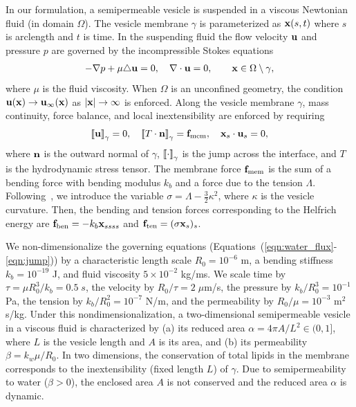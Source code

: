 \documentclass[prb,preprint,showpacs,preprintnumbers,amsmath,amssymb,longbibliography]{revtex4-1}
\begin{document}

In our formulation, a semipermeable vesicle is suspended in a viscous Newtonian fluid 
(in domain $\Omega$).  The vesicle membrane $\gamma$ is parameterized as $\mathbf{x}(s,t)$
where $s$ is arclength and $t$ is time. In the suspending fluid the flow
velocity $\mathbf{u}$ and pressure $p$ are governed by the incompressible 
Stokes equations
\begin{align}
  \label{eqn:governing}
  -\nabla p + \mu \triangle \mathbf{u} = 0, \quad
  \nabla \cdot \mathbf{u} = 0, \qquad \mathbf{x} \in \Omega \setminus \gamma,
\end{align}
where $\mu$ is the fluid viscosity. When $\Omega$ is an unconfined
geometry, the condition $\mathbf{u}(\mathbf{x}) \rightarrow \mathbf{u}_\infty(\mathbf{x})$ as $|\mathbf{x}|
\rightarrow \infty$ is enforced. 
%
Along the vesicle membrane $\gamma$,
mass continuity, force balance, and local inextensibility are enforced
by requiring
\begin{align}
  \label{eqn:jump}
  \left[\!\left[ \mathbf{u} \right]\!\right]_\gamma = 0, \quad
  \left[\!\left[ T\cdot\mathbf{n} \right]\!\right]_\gamma = \mathbf{f}_\mathrm{mem}, \quad
  \mathbf{x}_s \cdot \mathbf{u}_s = 0,
\end{align}
where $\mathbf{n}$ is the outward normal of $\gamma$, $\left[\!\left[ \cdot \right]\!\right]_\gamma$ is the
jump across the interface, and $T$ is the hydrodynamic stress tensor.
The membrane force $\mathbf{f}_\mathrm{mem}$ is the sum of a bending force
with bending modulus $k_b$ and a force due to the tension $\Lambda$.
Following~\cite{vee-gue-zor-bir2009}, we introduce the variable $\sigma
= \Lambda - \frac{3}{2}\kappa^2$, where $\kappa$ is the vesicle curvature. Then,
the bending and tension forces corresponding to the Helfrich energy are
$\mathbf{f}_\mathrm{ben} = -k_b \mathbf{x}_{ssss}$ and $\mathbf{f}_\mathrm{ten} = (\sigma
\mathbf{x}_s)_s$. 


We non-dimensionalize the governing equations (Equations~(\ref{eqn:water_flux}-\ref{eqn:jump})) by a
characteristic length scale $R_0 = 10^{-6}$ m, a bending stiffness $k_b
= 10^{-19}$ J, and fluid viscosity $5 \times 10^{-2}$ kg/ms. We scale
time by $\tau = \mu R_0^3/k_b = 0.5\;s$, the velocity by $R_0/\tau =
2\;\mu$m/s, the pressure by $k_b/R_0^3 = 10^{-1}$ Pa, the tension by
$k_b/R_0^2 = 10^{-7}$ N/m, and the permeability by $R_0/\mu = 10^{-3}$
m$^2$s/kg. Under this nondimensionalization, a two-dimensional
semipermeable vesicle in a viscous fluid is characterized by (a) its
reduced area $\alpha = 4\pi A/L^2 \in (0,1]$, where $L$ is the vesicle
length and $A$ is its area, and (b) its permeability $\beta = k_w \mu
/R_0$. 
In two dimensions, the conservation of total lipids in the membrane corresponds to the inextensibility (fixed length $L$) of $\gamma$.
Due to semipermeability to water ($\beta>0$),  the enclosed area $A$ is not conserved and the reduced area $\alpha$ is dynamic. 
\end{document}
